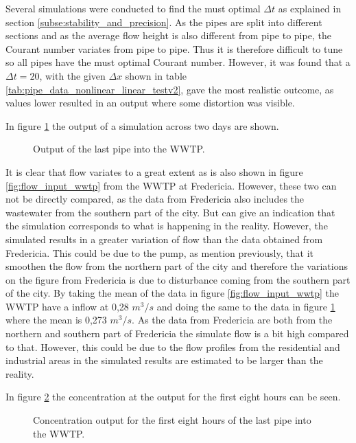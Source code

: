 Several simulations were conducted to find the must optimal $\Delta t$ as explained in section \ref{subse:stability_and_precision}. As the pipes are split into different sections and as the average flow height is also different from pipe to pipe, the Courant number variates from pipe to pipe. Thus it is therefore difficult to tune so all pipes have the must optimal Courant number. However, it was found that a $\Delta t = 20$, with the given $\Delta x$ shown in table \ref{tab:pipe_data_nonlinear_linear_testv2}, gave the most realistic outcome, as values lower resulted in an output where some distortion was visible.

In figure \ref{fig:simulation_output_first} the output of a simulation across two days are shown. 

\begin{figure}[H]
\centering

\caption{Output of the last pipe into the WWTP.}
\label{fig:simulation_output_first}
\end{figure}  

It is clear that flow variates to a great extent as is also shown in figure \ref{fig:flow_input_wwtp} from the WWTP at Fredericia. However, these two can not be directly compared, as the data from Fredericia also includes the wastewater from the southern part of the city. But can give an indication that the simulation corresponds to what is happening in the reality. However, the simulated results in a greater variation of flow than the data obtained from Fredericia. This could be due to the pump, as mention previously, that it smoothen the flow from the northern part of the city and therefore the variations on the figure from Fredericia is due to disturbance coming from the southern part of the city. By taking the mean of the data in figure \ref{fig:flow_input_wwtp} the WWTP have a inflow at 0,28 $m^3/s$ and doing the same to the data in figure \ref{fig:simulation_output_first} where the mean is 0,273 $m^3/s$. As the data from Fredericia are both from the northern and southern part of Fredericia the simulate flow is a bit high compared to that. However, this could be due to the flow profiles from the residential and industrial areas in the simulated results are estimated to be larger than the reality.     

In figure \ref{fig:simulation_output_first_concentration} the concentration at the output for the first eight hours can be seen.

\begin{figure}[H]
\centering

\caption{Concentration output for the first eight hours of the last pipe into the WWTP.}
\label{fig:simulation_output_first_concentration}
\end{figure}  

